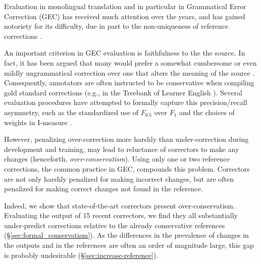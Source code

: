 \documentclass[letterpaper, 11pt]{article}
\begin{document}
Evaluation in monolingual translation \cite{xu2015problems,inderjeet2009summarization} and
in particular in Grammatical Error Correction (GEC)
\cite{tetreault2008native,madnani2011they,felice2015towards,bryant2015far,napoles2015ground}
has received much attention over the years, and has gained notoriety for its difficulty,
due in part to the non-uniqueness of reference corrections \cite{chodorow2012problems}.

An important criterion in GEC evaluation is faithfulness to the the source. 
In fact, it has been argued that many would prefer a somewhat cumbersome or even mildly ungrammatical 
correction over one that alters the meaning of the source \cite{brockett2006correcting}.
Consequently, annotators are often instructed to be conservative when compiling gold standard corrections (e.g., in the Treebank of Learner English \cite{nicholls2003cambridge}).
Several evaluation procedures have attempted to formally capture this precision/recall asymmetry,
such as the standardized use of $F_{0.5}$ over $F_{1}$ \cite{ng2014conll} and the 
choices of weights in I-measure \cite{felice2015towards}.

However, penalizing over-correction more harshly than under-correction during development and training, 
may lead to reluctance of correctors to make any changes (henceforth, {\it over-conservatism}).
Using only one or two reference corrections, the common practice in GEC, compounds this problem. Correctors are not only harshly penalized for making incorrect changes, but are often penalized
for making correct changes not found in the reference.

Indeed, we show that state-of-the-art correctors present over-conservatism.
Evaluating the output of 15 recent correctors, we find they all
substantially under-predict corrections relative to the already conservative references
(\S\ref{sec:formal_conservatism}).
As the differences in the prevalence of changes in the outputs and in the references are
often an order of magnitude large, this gap is probably undesirable (\S\ref{sec:increase-reference}).
\end{document}
